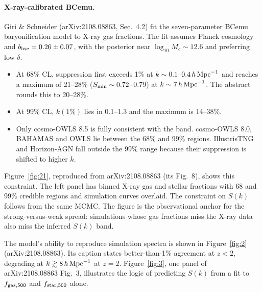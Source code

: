 \documentclass[11pt,a4paper]{article}
\begin{document}
\paragraph{X-ray-calibrated BCemu.} Giri \& Schneider (arXiv:2108.08863, Sec.~4.2) fit the seven-parameter BCemu baryonification model to X-ray gas fractions. The fit assumes Planck cosmology and $b_{\rm hse}=0.26\pm0.07$, with the posterior near $\log_{10}M_c\sim12.6$ and preferring low $\delta$.
\begin{itemize}
\item At 68\% CL, suppression first exceeds 1\% at $k\sim0.1$--$0.4\,h\,{\rm Mpc}^{-1}$ and reaches a maximum of 21--28\% ($S_{\rm min}\sim0.72$--0.79) at $k\sim7\,h\,{\rm Mpc}^{-1}$. The abstract rounds this to 20--28\%.
\item At 99\% CL, $k(1\%)$ lies in 0.1--1.3 and the maximum is 14--38\%.
\item Only cosmo-OWLS 8.5 is fully consistent with the band. cosmo-OWLS 8.0, BAHAMAS and OWLS lie between the 68\% and 99\% regions. IllustrisTNG and Horizon-AGN fall outside the 99\% range because their suppression is shifted to higher $k$.
\end{itemize}






Figure~\ref{fig:21}, reproduced from arXiv:2108.08863 (its Fig.~8), shows this constraint. The left panel has binned X-ray gas and stellar fractions with 68 and 99\% credible regions and simulation curves overlaid. The constraint on $S(k)$ follows from the same MCMC. The figure is the observational anchor for the strong-versus-weak spread: simulations whose gas fractions miss the X-ray data also miss the inferred $S(k)$ band.

The model's ability to reproduce simulation spectra is shown in Figure~\ref{fig:2} (arXiv:2108.08863). Its caption states better-than-1\% agreement at $z<2$, degrading at $k\gtrsim8\,h\,{\rm Mpc}^{-1}$ at $z=2$. Figure~\ref{fig:3}, one panel of arXiv:2108.08863 Fig.~3, illustrates the logic of predicting $S(k)$ from a fit to $f_{\rm gas,500}$ and $f_{\rm star,500}$ alone.
\end{document}
